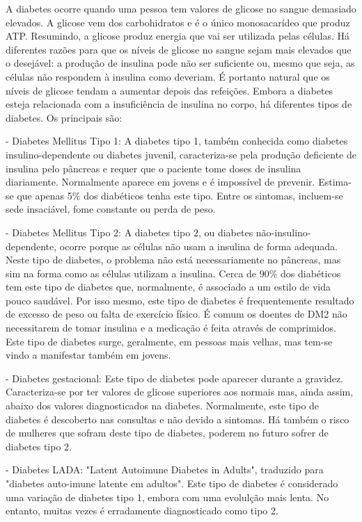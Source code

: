 A diabetes ocorre quando uma pessoa tem valores de glicose no sangue demasiado elevados. A glicose vem dos carbohidratos e é o único monosacarídeo que produz ATP. Resumindo, a glicose produz energia que vai ser utilizada pelas células. Há diferentes razões para que os níveis de glicose no sangue sejam mais elevados que o desejável: a produção de insulina pode não ser suficiente ou, mesmo que seja, as células não respondem à insulina como deveriam. É portanto natural que os níveis de glicose tendam a aumentar depois das refeições. Embora a diabetes esteja relacionada com a insuficiência de insulina no corpo, há diferentes tipos de diabetes. Os principais são:

- Diabetes Mellitus Tipo 1: A diabetes tipo 1, também conhecida como diabetes insulino-dependente ou diabetes juvenil, caracteriza-se pela produção deficiente de insulina pelo pâncreas e requer que o paciente tome doses de insulina diariamente. Normalmente aparece em jovens e é impossível de prevenir. Estima-se que apenas 5\% dos diabéticos tenha este tipo. Entre os sintomas, incluem-se sede insaciável, fome constante ou perda de peso.

- Diabetes Mellitus Tipo 2: A diabetes tipo 2, ou diabetes não-insulino-dependente, ocorre porque as células não usam a insulina de forma adequada. Neste tipo de diabetes, o problema não está necessariamente no pâncreas, mas sim na forma como as células utilizam a insulina. Cerca de 90\% dos diabéticos tem este tipo de diabetes que, normalmente, é associado a um estilo de vida pouco saudável. Por isso mesmo, este tipo de diabetes é frequentemente resultado de excesso de peso ou falta de exercício físico. É comum os doentes de DM2 não necessitarem de tomar insulina e a medicação é feita através de comprimidos. Este tipo de diabetes surge, geralmente, em pessoas mais velhas, mas tem-se vindo a manifestar também em jovens.

- Diabetes gestacional: Este tipo de diabetes pode aparecer durante a gravidez. Caracteriza-se por ter valores de glicose superiores aos normais mas, ainda assim, abaixo dos valores diagnosticados na diabetes. Normalmente, este tipo de diabetes é descoberto nas consultas e não devido a sintomas. Há também o risco de mulheres que sofram deste tipo de diabetes, poderem no futuro sofrer de diabetes tipo 2.

- Diabetes LADA: "Latent Autoimune Diabetes in Adults", traduzido para "diabetes auto-imune latente em adultos". Este tipo de diabetes é considerado uma variação de diabetes tipo 1, embora com uma evolulção mais lenta. No entanto, muitas vezes é erradamente diagnosticado como tipo 2.

